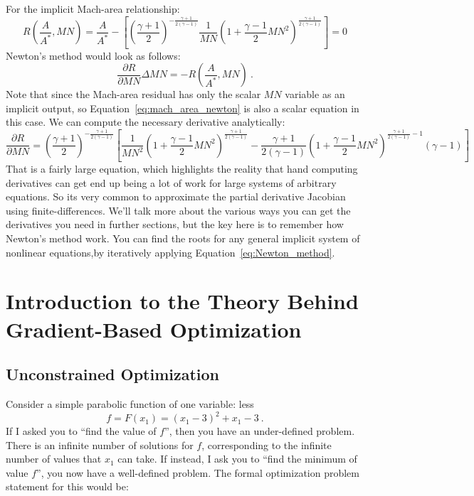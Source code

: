 \documentclass[conf]{new-aiaa}
\begin{document}
For the implicit Mach-area relationship: 
\begin{equation}
    R(\frac{A}{A^*}, MN) = \frac{A}{A^*} - \left[ \left(\frac{\gamma+1}{2}\right)^{-\frac{\gamma+1}{2(\gamma-1)}} 
                    \frac{1}{MN} 
                    \left( 1 + \frac{\gamma-1}{2}MN^2 \right)^{\frac{\gamma+1}{2(\gamma-1)}}\right] = 0
                    \label{eq:implicit_mach_area}
\end{equation}
Newton's method would look as follows: 
\begin{equation}
    \frac{\partial R}{\partial MN} \Delta MN = -R(\frac{A}{A^*}, MN) \ .
    \label{eq:mach_area_newton}
\end{equation}
Note that since the Mach-area residual has only the scalar $MN$ variable as an implicit output, so Equation~\eqref{eq:mach_area_newton} 
is also a scalar equation in this case. 
We can compute the necessary derivative analytically: 
\begin{equation}
    \frac{\partial R}{\partial MN} = \left(\frac{\gamma+1}{2}\right)^{-\frac{\gamma+1}{2(\gamma-1)}} 
    \left[\frac{1}{MN^2} \left( 1 + \frac{\gamma-1}{2}MN^2 \right)^{\frac{\gamma+1}{2(\gamma-1)}} - 
       \frac{\gamma+1}{2(\gamma-1)}\left( 1 + \frac{\gamma-1}{2}MN^2 \right)^{\frac{\gamma+1}{2(\gamma-1)} - 1}(\gamma-1)
    \right] 
\end{equation}
That is a fairly large equation, which highlights the reality that hand computing derivatives can get end up being a lot of work for large systems of arbitrary equations. 
So its very common to approximate the partial derivative Jacobian using finite-differences. 
We'll talk more about the various ways you can get the derivatives you need in further sections, 
but the key here is to remember how Newton's method work. 
You can find the roots for any general implicit system of nonlinear equations,by iteratively applying Equation~\eqref{eq:Newton_method}. 


\section{Introduction to the Theory Behind Gradient-Based Optimization}

    \subsection{Unconstrained Optimization}
    Consider a simple parabolic function of one variable: less
    \begin{equation}
        f = F(x_1) = (x_1 - 3)^2 + x_1 - 3 \ . 
    \end{equation}
    If I asked you to ``find the value of $f$'', then you have an under-defined problem. 
    There is an infinite number of solutions for $f$, corresponding to the infinite number of values that $x_1$ can take. 
    If instead, I ask you to ``find the minimum of value $f$'', you now have a well-defined problem.    
    The formal optimization problem statement for this would be: 
\end{document}
